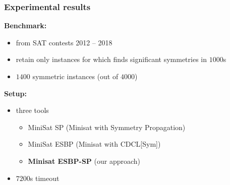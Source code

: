 \documentclass{beamer}
\begin{document}

\begin{frame}
\frametitle{Experimental results}

\textbf{Benchmark:}
\begin{itemize}
	\item from SAT contests 2012 -- 2018
	\item retain only instances for which \bliss{} finds significant symmetries in $1000$s
	\item $1400$ symmetric instances (out of $4000$)
\end{itemize}

\vfill

\textbf{Setup:}
\begin{itemize}
	\item three tools

	\begin{itemize}
		\item \scriptsize MiniSat SP (Minisat with Symmetry Propagation)
		\item \scriptsize MiniSat ESBP (Minisat with CDCL[Sym])
		\item \scriptsize \textbf{Minisat ESBP-SP} (our approach)
	\end{itemize}
	\item $7200$s timeout
\end{itemize}

\centering


\end{frame}

\end{document}
